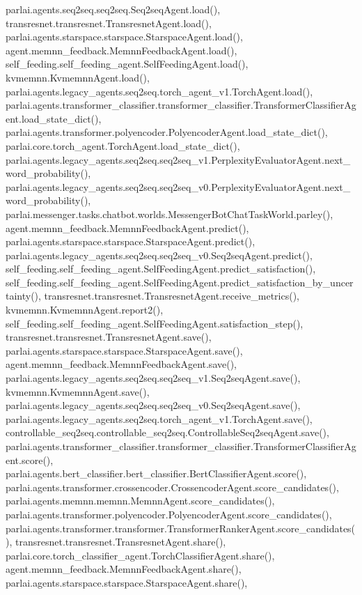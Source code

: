 parlai.\+agents.\+seq2seq.\+seq2seq.\+Seq2seq\+Agent.\+load(), transresnet.\+transresnet.\+Transresnet\+Agent.\+load(), parlai.\+agents.\+starspace.\+starspace.\+Starspace\+Agent.\+load(), agent.\+memnn\+\_\+feedback.\+Memnn\+Feedback\+Agent.\+load(), self\+\_\+feeding.\+self\+\_\+feeding\+\_\+agent.\+Self\+Feeding\+Agent.\+load(), kvmemnn.\+Kvmemnn\+Agent.\+load(), parlai.\+agents.\+legacy\+\_\+agents.\+seq2seq.\+torch\+\_\+agent\+\_\+v1.\+Torch\+Agent.\+load(), parlai.\+agents.\+transformer\+\_\+classifier.\+transformer\+\_\+classifier.\+Transformer\+Classifier\+Agent.\+load\+\_\+state\+\_\+dict(), parlai.\+agents.\+transformer.\+polyencoder.\+Polyencoder\+Agent.\+load\+\_\+state\+\_\+dict(), parlai.\+core.\+torch\+\_\+agent.\+Torch\+Agent.\+load\+\_\+state\+\_\+dict(), parlai.\+agents.\+legacy\+\_\+agents.\+seq2seq.\+seq2seq\+\_\+v1.\+Perplexity\+Evaluator\+Agent.\+next\+\_\+word\+\_\+probability(), parlai.\+agents.\+legacy\+\_\+agents.\+seq2seq.\+seq2seq\+\_\+v0.\+Perplexity\+Evaluator\+Agent.\+next\+\_\+word\+\_\+probability(), parlai.\+messenger.\+tasks.\+chatbot.\+worlds.\+Messenger\+Bot\+Chat\+Task\+World.\+parley(), agent.\+memnn\+\_\+feedback.\+Memnn\+Feedback\+Agent.\+predict(), parlai.\+agents.\+starspace.\+starspace.\+Starspace\+Agent.\+predict(), parlai.\+agents.\+legacy\+\_\+agents.\+seq2seq.\+seq2seq\+\_\+v0.\+Seq2seq\+Agent.\+predict(), self\+\_\+feeding.\+self\+\_\+feeding\+\_\+agent.\+Self\+Feeding\+Agent.\+predict\+\_\+satisfaction(), self\+\_\+feeding.\+self\+\_\+feeding\+\_\+agent.\+Self\+Feeding\+Agent.\+predict\+\_\+satisfaction\+\_\+by\+\_\+uncertainty(), transresnet.\+transresnet.\+Transresnet\+Agent.\+receive\+\_\+metrics(), kvmemnn.\+Kvmemnn\+Agent.\+report2(), self\+\_\+feeding.\+self\+\_\+feeding\+\_\+agent.\+Self\+Feeding\+Agent.\+satisfaction\+\_\+step(), transresnet.\+transresnet.\+Transresnet\+Agent.\+save(), parlai.\+agents.\+starspace.\+starspace.\+Starspace\+Agent.\+save(), agent.\+memnn\+\_\+feedback.\+Memnn\+Feedback\+Agent.\+save(), parlai.\+agents.\+legacy\+\_\+agents.\+seq2seq.\+seq2seq\+\_\+v1.\+Seq2seq\+Agent.\+save(), kvmemnn.\+Kvmemnn\+Agent.\+save(), parlai.\+agents.\+legacy\+\_\+agents.\+seq2seq.\+seq2seq\+\_\+v0.\+Seq2seq\+Agent.\+save(), parlai.\+agents.\+legacy\+\_\+agents.\+seq2seq.\+torch\+\_\+agent\+\_\+v1.\+Torch\+Agent.\+save(), controllable\+\_\+seq2seq.\+controllable\+\_\+seq2seq.\+Controllable\+Seq2seq\+Agent.\+save(), parlai.\+agents.\+transformer\+\_\+classifier.\+transformer\+\_\+classifier.\+Transformer\+Classifier\+Agent.\+score(), parlai.\+agents.\+bert\+\_\+classifier.\+bert\+\_\+classifier.\+Bert\+Classifier\+Agent.\+score(), parlai.\+agents.\+transformer.\+crossencoder.\+Crossencoder\+Agent.\+score\+\_\+candidates(), parlai.\+agents.\+memnn.\+memnn.\+Memnn\+Agent.\+score\+\_\+candidates(), parlai.\+agents.\+transformer.\+polyencoder.\+Polyencoder\+Agent.\+score\+\_\+candidates(), parlai.\+agents.\+transformer.\+transformer.\+Transformer\+Ranker\+Agent.\+score\+\_\+candidates(), transresnet.\+transresnet.\+Transresnet\+Agent.\+share(), parlai.\+core.\+torch\+\_\+classifier\+\_\+agent.\+Torch\+Classifier\+Agent.\+share(), agent.\+memnn\+\_\+feedback.\+Memnn\+Feedback\+Agent.\+share(), parlai.\+agents.\+starspace.\+starspace.\+Starspace\+Agent.\+share(), 